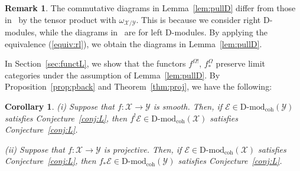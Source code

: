 \documentclass [11pt,oneside,a4paper,mathscr]{amsart}
\newtheorem{cor}[thm]{Corollary}
\theoremstyle{definition}
\newtheorem{remark}[thm]{Remark}
\newcommand{\Spec}{\operatorname{Spec}}
\begin{document}
\begin{remark}
    The commutative diagrams in Lemma~\ref{lem:pullD} 
    differ from those in~\cite{Laufilt, CDK} by the tensor product with $\omega_{\mathcal{X}/\mathcal{Y}}$. 
    This is because we consider right D-modules, while the 
    diagrams in~\cite{Laufilt, CDK} are for left D-modules. By applying the 
    equivalence (\ref{equiv:rl}), we obtain the diagrams in Lemma~\ref{lem:pullD}. 
\end{remark}

In Section~\ref{sec:functL}, we show that the functors $f^{\Omega!}$, $f_{*}^{\Omega}$ preserve limit 
categories under the assumption of Lemma~\ref{lem:pullD}. 
By Proposition~\ref{prop:pback} and Theorem~\ref{thm:proj}, 
we have the following: 
\begin{cor}\label{cor:funcL}
(i) Suppose that $f\colon \mathcal{X} \to \mathcal{Y}$ is smooth. 
Then, if $\mathcal{E} \in \mathrm{D}\text{-}\mathrm{mod}_{\mathrm{coh}}(\mathcal{Y})$
satisfies Conjecture~\ref{conj:L}, then 
$f^! \mathcal{E} \in \mathrm{D}\text{-}\mathrm{mod}_{\mathrm{coh}}(\mathcal{X})$ satisfies 
Conjecture~\ref{conj:L}. 

(ii) Suppose that $f\colon \mathcal{X} \to \mathcal{Y}$ is projective. 
Then, if $\mathcal{E} \in \mathrm{D}\text{-}\mathrm{mod}_{\mathrm{coh}}(\mathcal{X})$
satisfies Conjecture~\ref{conj:L}, then 
$f_{\ast} \mathcal{E} \in \mathrm{D}\text{-}\mathrm{mod}_{\mathrm{coh}}(\mathcal{Y})$ satisfies 
Conjecture~\ref{conj:L}. 
\end{cor}




\end{document}
